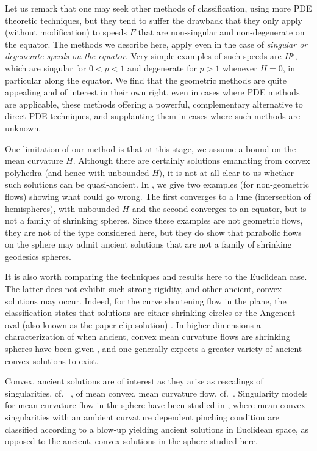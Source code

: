\documentclass{amsart}
\begin{document}
Let us remark that one may seek other methods of classification, using more PDE theoretic techniques, but they tend to suffer the drawback that they only apply (without modification) to speeds \(F\) that are non-singular and non-degenerate on the equator. The methods we describe here, apply even in the case of \emph{singular or degenerate speeds on the equator}. Very simple examples of such speeds are \(H^p\), which are singular for \(0 < p < 1\) and degenerate for \(p > 1\) whenever \(H = 0\), in particular along the equator. We find that the geometric methods are quite appealing and of interest in their own right, even in cases where PDE methods are applicable, these methods offering a powerful, complementary alternative to direct PDE techniques, and supplanting them in cases where such methods are unknown.

One limitation of our method is that at this stage, we assume a bound on the mean curvature \(H\). Although there are certainly solutions emanating from convex polyhedra (and hence with unbounded \(H\)), it is not at all clear to us whether such solutions can be quasi-ancient. In , we give two examples (for non-geometric flows) showing what could go wrong. The first converges to a lune (intersection of hemispheres), with unbounded \(H\) and the second converges to an equator, but is not a family of shrinking spheres. Since these examples are not geometric flows, they are not of the type considered here, but they do show that parabolic flows on the sphere may admit ancient solutions that are not a family of shrinking geodesics spheres.

It is also worth comparing the techniques and results here to the Euclidean case. The latter does not exhibit such strong rigidity, and other ancient, convex solutions may occur. Indeed, for the curve shortening flow in the plane, the classification \cite{DaskalopoulosHamiltonSesum:/2010} states that solutions are either shrinking circles or the Angenent oval (also known as the paper clip solution) \cite{Angenent:/1992}. In higher dimensions a characterization of when ancient, convex mean curvature flows are shrinking spheres have been given \cite{HuiskenSinestrari:10/2015,HaslhoferHershkovits:08/2013}, and one generally expects a greater variety of ancient convex solutions to exist.

Convex, ancient solutions are of interest as they arise as rescalings of singularities, cf.~ \cite{HuiskenSinestrari:01/1999}, of mean convex, mean curvature flow, cf.~\cite{HuiskenSinestrari:09/1999, White:10/2002}. Singularity models for mean curvature flow in the sphere have been studied in \cite{Nguyen:07/2015}, where mean convex singularities with an ambient curvature dependent pinching condition are classified according to a blow-up yielding ancient solutions in Euclidean space, as opposed to the ancient, convex solutions in the sphere studied here.
\end{document}
